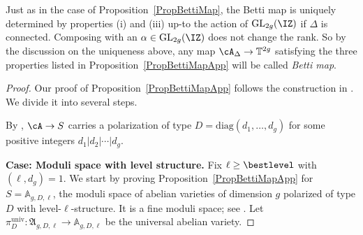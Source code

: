 Just as in the case of
Proposition~\ref{PropBettiMap}, the Betti map
is uniquely determined  by properties (i) and (iii)
up-to the action of $\mathrm{GL}_{2g}(\IZ)$ if $\Delta$ is
connected.
 Composing with an $\alpha \in \mathrm{GL}_{2g}(\IZ)$ does not change the rank. So by the discussion on the uniqueness above, any map $\cA_{\Delta} \rightarrow \mathbb{T}^{2g}$ satisfying the three properties listed in Proposition~\ref{PropBettiMapApp} will be called \textit{Betti map}.%
\begin{proof} Our proof of Proposition~\ref{PropBettiMapApp} follows the construction in \cite[$\mathsection$3-$\mathsection$4]{GaoBettiRank}. We divide it into several steps.

By \cite[$\mathsection$2.1]{GenestierNgo}, $\cA \rightarrow S$ carries a polarization of type $D = \mathrm{diag}(d_1,\ldots,d_g)$ for some positive integers $d_1|d_2|\cdots|d_g$.

  \textbf{Case: Moduli space with level structure.}
Fix $\ell \ge \bestlevel$ with $(\ell,d_g) = 1$. We start by proving Proposition~\ref{PropBettiMapApp} for $S = \mathbb
A_{g,D,\ell}$, the moduli space of abelian varieties of
dimension $g$ polarized of type $D$ with level-$\ell$-structure. It is a fine moduli
space; see \cite[Theorem~2.3.1]{GenestierNgo}. Let $\pi^{\mathrm{univ}}_D \colon \mathfrak{A}_{g,D,\ell} \rightarrow \mathbb A_{g,D,\ell}$ be the universal abelian variety.


\end{proof}
